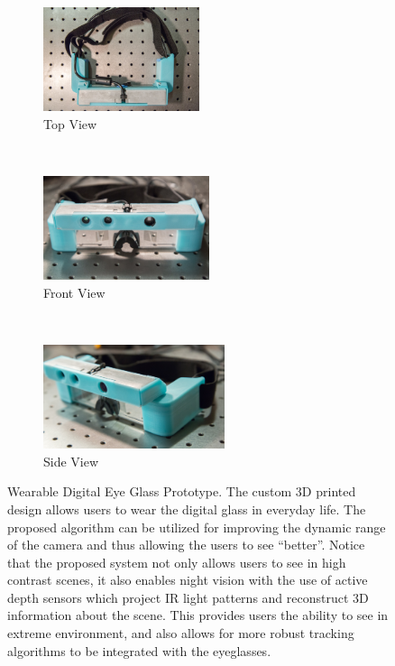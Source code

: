 \begin{figure}
\centering
\begin{subfigure}{.32\textwidth}
\centering
\includegraphics[height=1.2in]{ch4/diagrams/hdrglass/lowres/IMG_0257.jpg}
\caption{Top View}
\label{fig_third_case}
\end{subfigure}
~
\begin{subfigure}{.32\textwidth}
\centering
\includegraphics[height=1.2in]{ch4/diagrams/hdrglass/lowres/IMG_0263.jpg}
\caption{Front View}
\label{fig_second_case}
\end{subfigure}
~
\begin{subfigure}{.32\textwidth}
\centering
\includegraphics[height=1.2in]{ch4/diagrams/hdrglass/lowres/IMG_0258.jpg}
\caption{Side View}
\label{fig_first_case}
\end{subfigure}

\caption{Wearable Digital Eye Glass Prototype. The custom 3D printed design allows users to wear 
the digital glass in everyday life. The proposed algorithm can be utilized for improving the dynamic 
range of the camera and thus allowing the users to see ``better''. Notice that the proposed system 
not only allows users to see in high contrast scenes, it also enables night vision with the use of 
active depth sensors which project IR light patterns and reconstruct 3D information about the 
scene. This provides users the ability to see in extreme environment, and also allows for more 
robust tracking algorithms to be integrated with the eyeglasses.}
\label{fig_wearable_glass}
\end{figure}


